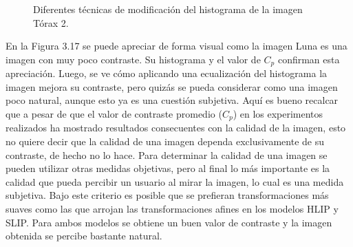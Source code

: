 \begin{figure}
\begin{center}
		\caption{Diferentes t\'ecnicas de modificaci\'on del histograma de la imagen T\'orax 2.}
	\end{center}
\end{figure}

En la Figura 3.17 se puede apreciar de forma visual como la imagen Luna es una imagen con muy poco contraste. Su histograma y el valor de $C_p$ confirman esta apreciaci\'on. Luego, se ve c\'omo aplicando una ecualizaci\'on del histograma la imagen mejora su contraste, pero quiz\'as se pueda considerar como una imagen poco natural, aunque esto ya es una cuesti\'on subjetiva. Aqu\'i es bueno recalcar que a pesar de que el valor de contraste promedio ($C_p$) en los experimentos realizados ha mostrado resultados consecuentes con la calidad de la imagen, esto no quiere decir que la calidad de una imagen dependa exclusivamente de su contraste, de hecho no lo hace. Para determinar la calidad de una imagen se pueden utilizar otras medidas objetivas, pero al final lo m\'as importante es la calidad que pueda percibir un usuario al mirar la imagen, lo cual es una medida subjetiva. Bajo este criterio es posible que se prefieran transformaciones m\'as suaves como las que arrojan las transformaciones afines en los modelos HLIP y SLIP. Para ambos modelos se obtiene un buen valor de contraste y la imagen obtenida se percibe bastante natural.

